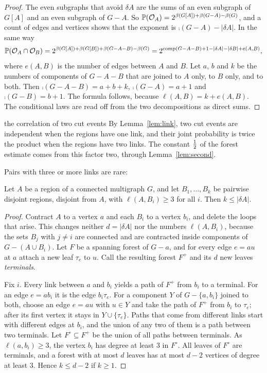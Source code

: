 \documentclass[11pt]{article}
\begin{document}
\begin{proof}
The even subgraphs that avoid $\delta A$ are the sums of an even subgraph of $G[A]$ and an even
subgraph of $G-A$. So $\mathbb{P}(\mathcal{O}_A)=2^{\beta(G[A])+\beta(G-A)-\beta(G)}$, and a count of edges and
vertices shows that the exponent is $\comp(G-A)-|\delta A|$. In the same way
\[
  \mathbb{P}(\mathcal{O}_A\cap\mathcal{O}_B)=2^{\beta(G[A])+\beta(G[B])+\beta(G-A-B)-\beta(G)}
     =2^{\operatorname{comp}(G-A-B)+1-|\delta A|-|\delta B|+e(A,B)},
\]
where $e(A,B)$ is the number of edges between $A$ and $B$. Let $a$, $b$ and $k$ be the numbers of
components of $G-A-B$ that are joined to $A$ only, to $B$ only, and to both. Then
$\comp(G-A-B)=a+b+k$, $\comp(G-A)=a+1$ and $\comp(G-B)=b+1$. The formula follows, because
$\ell(A,B)=k+e(A,B)$. The conditional laws are read off from the two decompositions as direct sums.
\end{proof}

\begin{idea}{the correlation of two cut events}
By Lemma~\ref{lem:link}, two cut events are independent when the regions have one link, and
their joint probability is twice the product when the regions have two links. The constant
$\tfrac12$ of the forest estimate comes from this factor two, through Lemma~\ref{lem:second}.
\end{idea}

Pairs with three or more links are rare:

\begin{lemma}\label{lem:exc}
Let $A$ be a region of a connected multigraph $G$, and let $B_1,\dots,B_k$ be pairwise disjoint
regions, disjoint from $A$, with $\ell(A,B_i)\ge3$ for all $i$. Then $k\le|\delta A|$.
\end{lemma}

\begin{proof}
Contract $A$ to a vertex $a$ and each $B_i$ to a vertex $b_i$, and delete the loops that arise.
This changes neither $d=|\delta A|$ nor the numbers $\ell(A,B_i)$, because the sets $B_j$ with
$j\ne i$ are connected and are contracted inside components of $G-(A\cup B_i)$. Let $F$ be a
spanning forest of $G-a$, and for every edge $e=au$ at $a$ attach a new leaf $\tau_e$ to $u$. Call
the resulting forest $F^{+}$ and its $d$ new leaves \emph{terminals}.

Fix $i$. Every link between $a$ and $b_i$ yields a path of $F^{+}$ from $b_i$ to a terminal. For an
edge $e=ab_i$ it is the edge $b_i\tau_e$. For a component $Y$ of $G-\{a,b_i\}$ joined to both,
choose an edge $e=au$ with $u\in Y$ and take the path of $F^{+}$ from $b_i$ to $\tau_e$; after its
first vertex it stays in $Y\cup\{\tau_e\}$. Paths that come from different links start with
different edges at $b_i$, and the union of any two of them is a path between two terminals. Let
$F^{\circ}\subseteq F^{+}$ be the union of all paths between terminals. As $\ell(a,b_i)\ge3$, the
vertex $b_i$ has degree at least $3$ in $F^{\circ}$. All leaves of $F^{\circ}$ are terminals, and a
forest with at most $d$ leaves has at most $d-2$ vertices of degree at least $3$. Hence $k\le d-2$
if $k\ge1$.
\end{proof}
\end{document}
